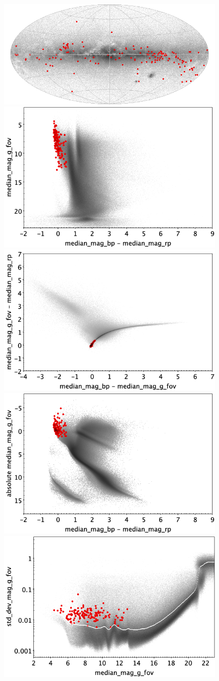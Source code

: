 \documentclass[longauth]{aa}
\begin{document}
\begin{appendix}
\begin{figure}
\centering
{} \includegraphics[width=0.6\hsize]{figures/appendix/SPB_trn_sky.png} \\ %
\vspace{4mm}
 \includegraphics[width=0.45\hsize]{figures/appendix/SPB_trn_cm.png}  %
\hspace{2mm}
 \includegraphics[width=0.45\hsize]{figures/appendix/SPB_trn_cc.png} \\ %
\vspace{4mm}
 \includegraphics[width=0.45\hsize]{figures/appendix/SPB_trn_cam.png}  %
\hspace{2mm}
 \includegraphics[width=0.45\hsize]{figures/appendix/SPB_trn_msd.png} \\ %

\end{figure}
\end{appendix}
\end{document}
